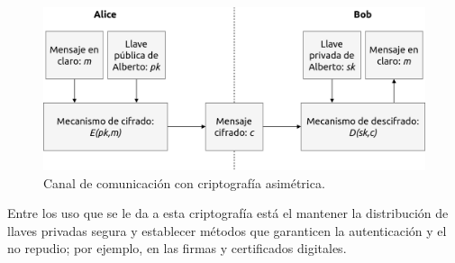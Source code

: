 \begin{figure}
  \begin{center}
    \includegraphics[width=0.8\linewidth]{diagramas/cripto_asimetrica.png}
    \caption{Canal de comunicación con criptografía asimétrica.}
    \label{cripto_asimetrica}
  \end{center}
\end{figure}

Entre los uso que se le da a esta criptografía está el mantener la
distribución de llaves privadas segura y establecer métodos que garanticen
la autenticación y el no repudio; por ejemplo, en las firmas y
certificados digitales.





